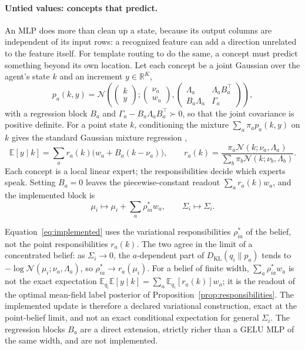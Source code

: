 \documentclass[11pt]{article}
\theoremstyle{definition}
\theoremstyle{remark}
\newcommand{\KL}{D_{\mathrm{KL}}}
\newcommand{\E}{\mathbb{E}}
\newcommand{\N}{\mathcal{N}}
\begin{document}
\paragraph{Untied values: concepts that predict.}
An MLP does more than clean up a state, because its output columns are independent of its input rows: a recognized feature can add a direction unrelated to the feature itself. For template routing to do the same, a concept must predict something beyond its own location. Let each concept be a joint Gaussian over the agent's state $k$ and an increment $y\in\mathbb{R}^K$,
\begin{equation}
p_a(k,y)=\N\left(\begin{pmatrix}k\\ y\end{pmatrix};\begin{pmatrix}\nu_a\\ w_a\end{pmatrix},\begin{pmatrix}\Lambda_a&\Lambda_aB_a^{\top}\\ B_a\Lambda_a&\Gamma_a\end{pmatrix}\right),
\end{equation}
with a regression block $B_a$ and $\Gamma_a-B_a\Lambda_aB_a^{\top}\succ0$, so that the joint covariance is positive definite. For a point state $k$, conditioning the mixture $\sum_a\pi_ap_a(k,y)$ on $k$ gives the standard Gaussian mixture regression \citep{ghahramani1994,jacobs1991},
\begin{equation}
\E[y\mid k]=\sum_ar_a(k)\bigl(w_a+B_a(k-\nu_a)\bigr),
\qquad
r_a(k)=\frac{\pi_a\N(k;\nu_a,\Lambda_a)}{\sum_b\pi_b\N(k;\nu_b,\Lambda_b)}.
\label{eq:gmr}
\end{equation}
Each concept is a local linear expert; the responsibilities decide which experts speak. Setting $B_a=0$ leaves the piecewise-constant readout $\sum_ar_a(k)w_a$, and the implemented block is
\begin{equation}
\mu_i\mapsto\mu_i+\sum_a\rho^{*}_{ia}w_a,
\qquad
\Sigma_i\mapsto\Sigma_i.
\label{eq:implemented}
\end{equation}

Equation~\eqref{eq:implemented} uses the variational responsibilities $\rho^{*}_{ia}$ of the belief, not the point responsibilities $r_a(k)$. The two agree in the limit of a concentrated belief: as $\Sigma_i\to0$, the $a$-dependent part of $\KL(q_i\|p_a)$ tends to $-\log\N(\mu_i;\nu_a,\Lambda_a)$, so $\rho^{*}_{ia}\to r_a(\mu_i)$. For a belief of finite width, $\sum_a\rho^{*}_{ia}w_a$ is not the exact expectation $\E_{q_i}\E[y\mid k]=\sum_a\E_{q_i}[r_a(k)]w_a$; it is the readout of the optimal mean-field label posterior of Proposition~\ref{prop:responsibilities}. The implemented update is therefore a declared variational construction, exact at the point-belief limit, and not an exact conditional expectation for general $\Sigma_i$. The regression blocks $B_a$ are a direct extension, strictly richer than a GELU MLP of the same width, and are not implemented.
\end{document}
